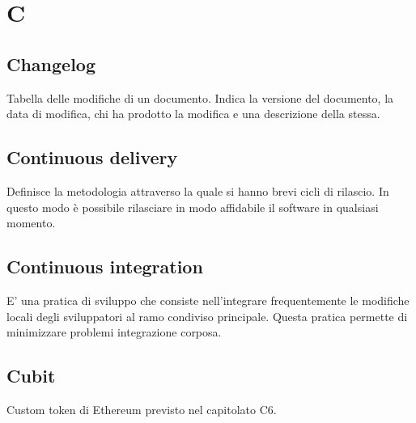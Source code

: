 \section*{C}
\subsection*{Changelog}
Tabella delle modifiche di un documento. Indica la versione del documento, la data di modifica, chi ha prodotto
la modifica e una descrizione della stessa.

\subsection*{Continuous delivery}
Definisce la metodologia attraverso la quale si hanno brevi cicli di rilascio. In questo modo è possibile rilasciare in modo affidabile il software in qualsiasi momento.

\subsection*{Continuous integration}
E’ una pratica di sviluppo che consiste nell’integrare frequentemente le modifiche locali degli sviluppatori al
ramo condiviso principale. Questa pratica permette di minimizzare problemi integrazione corposa.

\subsection*{Cubit}
Custom token di Ethereum previsto nel capitolato C6.

